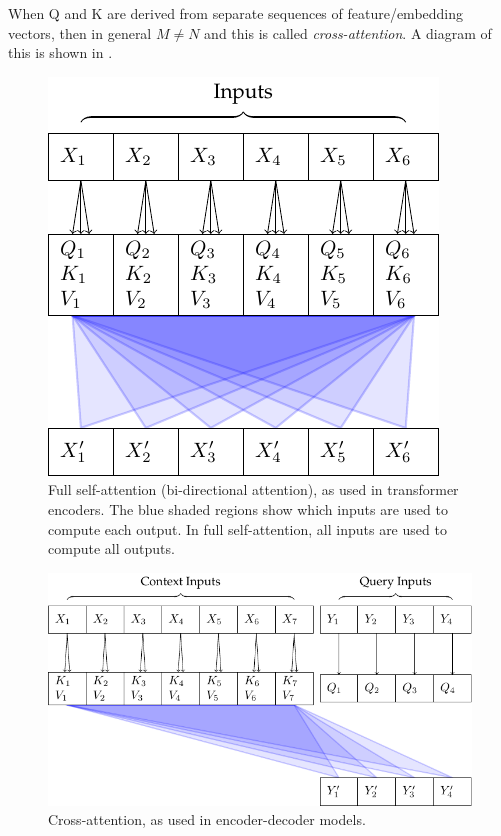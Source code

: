 When Q and K are derived from separate sequences of feature/embedding vectors, then in general $M ≠ N$ and this is called \textit{cross-attention}. A diagram of this is shown in .

\begin{figure}
    \centering
    \includegraphics[]{figures/attn-1-self.pdf}
    \caption[Self-attention]{Full self-attention (bi-directional attention), as used in transformer encoders. The blue shaded regions show which inputs are used to compute each output. In full self-attention, all inputs are used to compute all outputs.}
    \label{fig:self-attn}
\end{figure}


\begin{figure}
    \centering
    \includegraphics[]{figures/attn-2-cross.pdf}
    \caption[Cross-attention]{Cross-attention, as used in encoder-decoder models.}
    \label{fig:cross-attn}
\end{figure}

